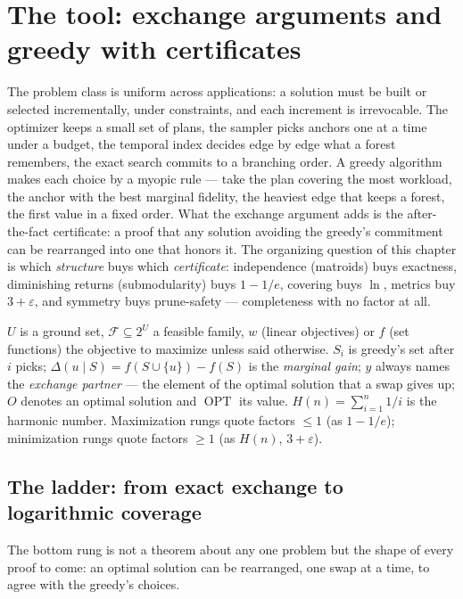 \section{The tool: exchange arguments and greedy with certificates}
\label{sec:exc-tool}

The problem class is uniform across applications: a solution must be built or selected
incrementally, under constraints, and each increment is irrevocable. The optimizer
keeps a small set of plans, the sampler picks anchors one at a time under a budget,
the temporal index decides edge by edge what a forest remembers, the exact search
commits to a branching order. A greedy algorithm makes each choice by a myopic rule
--- take the plan covering the most workload, the anchor with the best marginal
fidelity, the heaviest edge that keeps a forest, the first value in a fixed order.
What the exchange argument adds is the after-the-fact certificate: a proof that any
solution avoiding the greedy's commitment can be rearranged into one that honors it.
The organizing question of this chapter is which \emph{structure} buys which
\emph{certificate}: independence (matroids) buys exactness, diminishing returns
(submodularity) buys $1-1/e$, covering buys $\ln$, metrics buy $3+\varepsilon$, and
symmetry buys prune-safety --- completeness with no factor at all.

\begin{remarkbox}[Notation]
$U$ is a ground set, $\mathcal{F}\subseteq 2^U$ a feasible family, $w$ (linear
objectives) or $f$ (set functions) the objective to maximize unless said otherwise.
$S_i$ is greedy's set after $i$ picks; $\Delta(u \mid S) = f(S\cup\{u\}) - f(S)$ is
the \emph{marginal gain}; $y$ always names the \emph{exchange partner} --- the
element of the optimal solution that a swap gives up; $O$ denotes an optimal solution
and $\operatorname{OPT}$ its value. $H(n) = \sum_{i=1}^{n} 1/i$ is the harmonic
number. Maximization rungs quote factors $\le 1$ (as $1-1/e$); minimization rungs
quote factors $\ge 1$ (as $H(n)$, $3+\varepsilon$).
\end{remarkbox}

\subsection{The ladder: from exact exchange to logarithmic coverage}
\label{sec:exc-ladder}

The bottom rung is not a theorem about any one problem but the shape of every proof to
come: an optimal solution can be rearranged, one swap at a time, to agree with the
greedy's choices.

